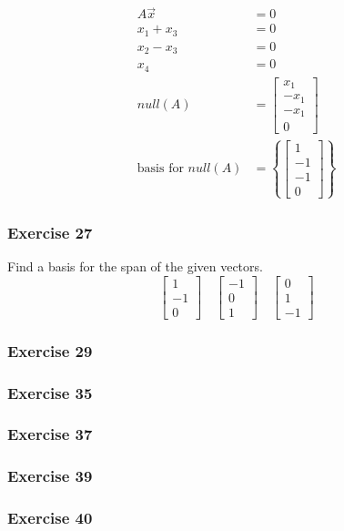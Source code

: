 \documentclass[letterpaper, 12pt]{math}
\begin{document}
\begin{align*}
  A\vec{x} &= 0 \\
  x_1+x_3 &= 0 \\
  x_2-x_3 &= 0 \\
  x_4 &= 0 \\
  null(A) &= \begin{bmatrix}
    x_1 \\ -x_1 \\ -x_1 \\ 0
  \end{bmatrix} \\
  \text{basis for } null(A) &= \left\{
    \begin{bmatrix}1 \\ -1 \\ -1 \\ 0\end{bmatrix}\right\}
\end{align*}

\subsubsection*{Exercise 27}
Find a basis for the span of the given vectors.
\[ \begin{bmatrix}1 \\ -1 \\ 0\end{bmatrix}\quad
  \begin{bmatrix}-1 \\ 0 \\ 1\end{bmatrix}\quad
  \begin{bmatrix}0 \\ 1 \\ -1\end{bmatrix} \]

\subsubsection*{Exercise 29}
\subsubsection*{Exercise 35}
\subsubsection*{Exercise 37}
\subsubsection*{Exercise 39}
\subsubsection*{Exercise 40}
\end{document}
